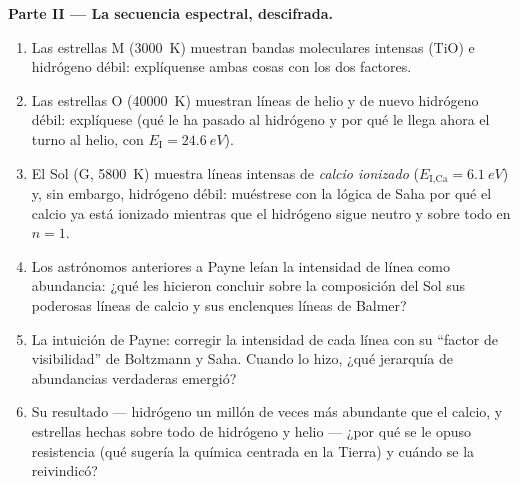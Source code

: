 \begin{problem}
\medskip\noindent\textbf{Parte II --- La secuencia espectral,
descifrada.}
\begin{enumerate}[resume]
  \item Las estrellas M (\qty{3000}{K}) muestran bandas moleculares
        intensas (TiO) e hidrógeno débil: explíquense ambas cosas con los
        dos factores.
  \item Las estrellas O (\qty{40000}{K}) muestran líneas de helio y de
        nuevo hidrógeno débil: explíquese (qué le ha pasado al hidrógeno y
        por qué le llega ahora el turno al helio, con
        $E_{\text{I}} = \qty{24.6}{eV}$).
  \item El Sol (G, \qty{5800}{K}) muestra líneas intensas de
        \emph{calcio ionizado} ($E_{\text{I,Ca}} = \qty{6.1}{eV}$)
        y, sin embargo, hidrógeno débil: muéstrese con la lógica de Saha
        por qué el calcio ya está ionizado mientras que el hidrógeno sigue
        neutro y sobre todo en $n = 1$.
  \item Los astrónomos anteriores a Payne leían la intensidad de línea
        como abundancia: ¿qué les hicieron concluir sobre la composición
        del Sol sus poderosas líneas de calcio y sus enclenques líneas de
        Balmer?
  \item La intuición de Payne: corregir la intensidad de cada línea con su
        ``factor de visibilidad'' de Boltzmann y Saha. Cuando lo hizo,
        ¿qué jerarquía de abundancias verdaderas emergió?
  \item Su resultado --- hidrógeno un millón de veces más abundante
        que el calcio, y estrellas hechas sobre todo de hidrógeno y helio
        --- ¿por qué se le opuso resistencia (qué sugería la química
        centrada en la Tierra) y cuándo se la reivindicó?
\end{enumerate}


\end{problem}
